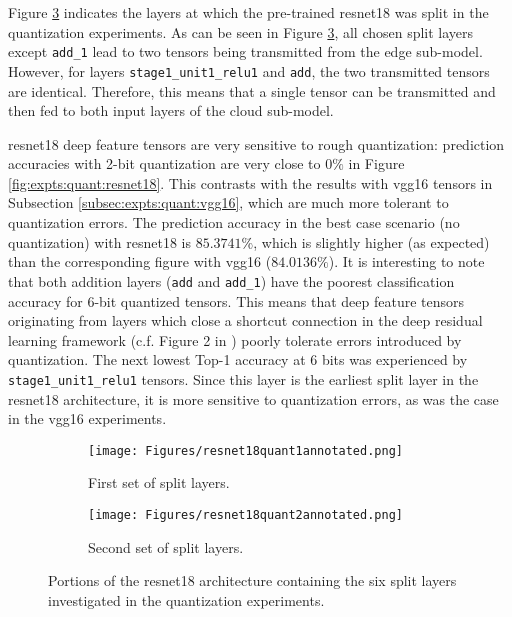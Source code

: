 Figure \ref{fig:expts:quant:resnet18:arch} indicates the layers at which the pre-trained \gls{resnet18} was split in the quantization experiments. As can be seen in Figure \ref{fig:expts:quant:resnet18:arch}, all chosen split layers except \verb|add_1| lead to two tensors being transmitted from the edge sub-model. However, for layers \verb|stage1_unit1_relu1| and \verb|add|, the two transmitted tensors are identical. Therefore, this means that a single tensor can be transmitted and then fed to both input layers of the cloud sub-model.

\gls{resnet18} deep feature tensors are very sensitive to rough quantization: prediction accuracies with 2-bit quantization are very close to $0\%$ in Figure \ref{fig:expts:quant:resnet18}. This contrasts with the results with \gls{vgg16} tensors in Subsection \ref{subsec:expts:quant:vgg16}, which are much more tolerant to quantization errors. The prediction accuracy in the best case scenario (no quantization) with \gls{resnet18} is $85.3741\%$, which is slightly higher (as expected) than the corresponding figure with \gls{vgg16} ($84.0136\%$). It is interesting to note that both addition layers (\verb|add| and \verb|add_1|) have the poorest classification accuracy for 6-bit quantized tensors. This means that deep feature tensors originating from layers which close a shortcut connection in the deep residual learning framework (c.f. Figure 2 in \cite{he2016deep}) poorly tolerate errors introduced by quantization. The next lowest Top-1 accuracy at 6 bits was experienced by \verb|stage1_unit1_relu1| tensors. Since this layer is the earliest split layer in the \gls{resnet18} architecture, it is more sensitive to quantization errors, as was the case in the \gls{vgg16} experiments.

\begin{figure}[H]
	\centering
	\begin{subfigure}{0.49\textwidth}
		\centering
		\texttt{[image: Figures/resnet18quant1annotated.png]}
		\caption{First set of split layers.} \label{fig:expts:quant:resnet18:arch:1}
	\end{subfigure}
\hfill
\begin{subfigure}{0.49\textwidth}
	\centering
	\texttt{[image: Figures/resnet18quant2annotated.png]}
	\caption{Second set of split layers.}
	\label{fig:expts:quant:resnet18:arch:2}
\end{subfigure}
\caption[ResNet18 architecture indicating split layers]{Portions of the \gls{resnet18} architecture containing the six split layers investigated in the quantization experiments.} \label{fig:expts:quant:resnet18:arch}
\end{figure}

